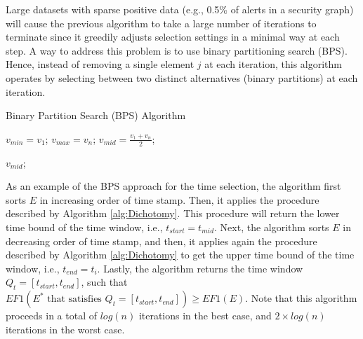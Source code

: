  Large datasets with sparse positive data (e.g., 0.5\% of alerts in a security graph) will cause the previous algorithm to take a large number of iterations to terminate since it greedily adjusts selection settings in a minimal way at each step.  A way to address this problem is to use binary partitioning search (BPS).  Hence, instead of removing a single element $j$ at each iteration, this algorithm operates by selecting between two distinct alternatives (binary partitions) at each iteration. 

\begin{algorithm}[t]
\caption{Binary Partition Search (BPS) Algorithm}
\SetAlgoLined
{}
\BlankLine
\label{alg:Dichotomy}

$v_{min}=v_1$; $v_{max}=v_n$;  $v_{mid}=\tfrac{v_1+v_n}{2}$;

\Return  $v_{mid}$;

\label{alg:return}
\end{algorithm} 




As an example of the BPS approach for the time selection, the algorithm first sorts $E$ in increasing order of time stamp. Then, it applies the procedure described by Algorithm \ref{alg:Dichotomy}. This procedure will return  the lower time bound of the time window, i.e., $t_{start}=t_{mid}$.
Next, the algorithm sorts $E$ in decreasing order of time stamp, and then, it applies again the procedure described by Algorithm \ref{alg:Dichotomy} to get the upper time bound of the time window, i.e., $t_{end}=t_i$. Lastly, the algorithm returns the  time window $Q_t=[t_{start},t_{end}]$, such that $EF1(E^{*} \textrm{ that satisfies } Q_t=[t_{start},t_{end}]) \geq EF1(E)$. Note that this algorithm proceeds in a total of $log(n)$ iterations in the best case, and $2\times log(n)$ iterations in the worst case.


